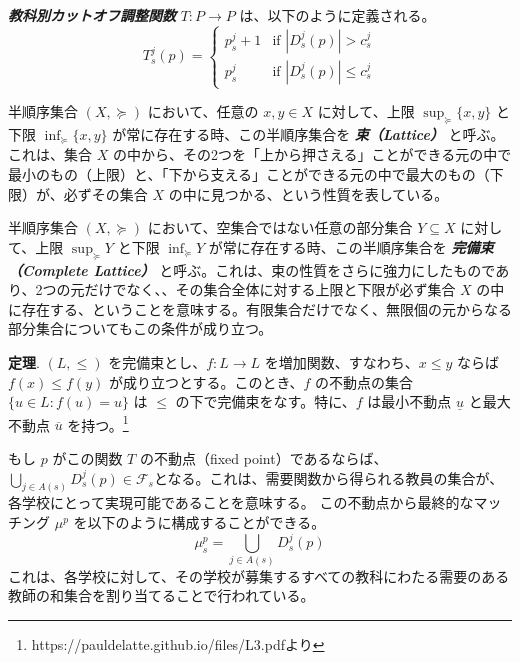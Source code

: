 \documentclass[12pt, a4paper]{article}
\theoremstyle{definition}
\theoremstyle{remark}
\theoremstyle{plain}
\begin{document}
\textbf{\textit{教科別カットオフ調整関数}} $T : P \rightarrow P$ は、以下のように定義される。
\[
T_s^j(p) =
\begin{cases}
p_s^j + 1 & \text{if } | D_s^j(p) | > c^j_s \\
p_s^j     & \text{if } | D_s^j(p) | \leq c^j_s
\end{cases}
\]




半順序集合 $(X, \succeq)$ において、任意の $x, y \in X$ に対して、上限 $\sup_{\succeq} \{x, y\}$ と下限 $\inf_{\succeq} \{x, y\}$ が常に存在する時、この半順序集合を \textbf{\textit{束（Lattice）}} と呼ぶ。これは、集合 $X$ の中から、その2つを「上から押さえる」ことができる元の中で最小のもの（上限）と、「下から支える」ことができる元の中で最大のもの（下限）が、必ずその集合 $X$ の中に見つかる、という性質を表している。


半順序集合 $(X, \succeq)$ において、空集合ではない任意の部分集合 $Y \subseteq X$ に対して、上限 $\sup_{\succeq} Y$ と下限 $\inf_{\succeq} Y$ が常に存在する時、この半順序集合を \textbf{\textit{完備束（Complete Lattice）}} と呼ぶ。これは、束の性質をさらに強力にしたものであり、2つの元だけでなく、、その集合全体に対する上限と下限が必ず集合 $X$ の中に存在する、ということを意味する。有限集合だけでなく、無限個の元からなる部分集合についてもこの条件が成り立つ。


\textbf{定理}. $(L, \leq)$ を完備束とし、$f: L \to L$ を増加関数、すなわち、$x \leq y$ ならば $f(x) \leq f(y)$ が成り立つとする。このとき、$f$ の不動点の集合 $\{ u \in L : f(u) = u \}$ は $\leq$ の下で完備束をなす。特に、$f$ は最小不動点 $\underline{u}$ と最大不動点 $\overline{u}$ を持つ。\footnote{https://pauldelatte.github.io/files/L3.pdfより}

\bigbreak

もし $p$ がこの関数 $T$ の不動点（fixed point）であるならば、$\bigcup_{j \in A(s)} D^j_s(p) \in \mathcal{F}_s$となる。これは、需要関数から得られる教員の集合が、各学校にとって実現可能であることを意味する。
この不動点から最終的なマッチング $\mu^p$ を以下のように構成することができる。
\[
\mu^{p}_s =\bigcup_{j \in A(s)} D^j_s(p)
\]
これは、各学校に対して、その学校が募集するすべての教科にわたる需要のある教師の和集合を割り当てることで行われている。
\end{document}
